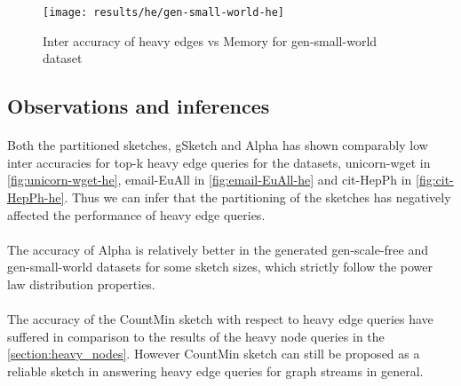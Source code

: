 \begin{figure}[H]
    \centering \texttt{[image: results/he/gen-small-world-he]}
    \vspace{-0.5cm}
    \caption{Inter accuracy of heavy edges vs Memory for gen-small-world dataset}
    \label{fig:gen-small-world-he}
\end{figure}

\subsection*{Observations and inferences}

\paragraph{}
Both the partitioned sketches, gSketch and Alpha has shown comparably low inter accuracies for top-k heavy edge queries for the datasets, unicorn-wget in \autoref{fig:unicorn-wget-he}, email-EuAll in \autoref{fig:email-EuAll-he} and cit-HepPh in \autoref{fig:cit-HepPh-he}. Thus we can infer that the partitioning of the sketches has negatively affected the performance of heavy edge queries.

\paragraph{}
The accuracy of Alpha is relatively better in the generated gen-scale-free and gen-small-world datasets for some sketch sizes, which strictly follow the power law distribution properties.

\paragraph{}
The accuracy of the CountMin sketch with respect to heavy edge queries have suffered in comparison to the results of the heavy node queries in the \autoref{section:heavy_nodes}. However CountMin sketch can still be proposed as a reliable sketch in answering heavy edge queries for graph streams in general.